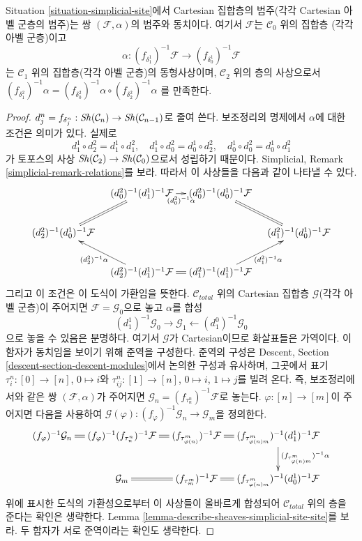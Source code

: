 \begin{lemma}
\label{lemma-characterize-cartesian}
Situation \ref{situation-simplicial-site}에서
Cartesian 집합층의 범주(각각 Cartesian 아벨 군층의 범주)는
쌍 $(\mathcal{F}, \alpha)$의 범주와 동치이다.
여기서 $\mathcal{F}$는 $\mathcal{C}_0$ 위의 집합층
(각각 아벨 군층)이고
$$
\alpha :
(f_{\delta_1^1})^{-1}\mathcal{F}
\longrightarrow (f_{\delta_0^1})^{-1}\mathcal{F}
$$
는 $\mathcal{C}_1$ 위의 집합층(각각 아벨 군층)의 동형사상이며,
$\mathcal{C}_2$ 위의 층의 사상으로서
$(f_{\delta^2_1})^{-1}\alpha =
(f_{\delta^2_0})^{-1}\alpha \circ (f_{\delta^2_2})^{-1}\alpha$
를 만족한다.
\end{lemma}

\begin{proof}
$d^n_j = f_{\delta^n_j} : \mathop{\mathit{Sh}}\nolimits(\mathcal{C}_n) \to
\mathop{\mathit{Sh}}\nolimits(\mathcal{C}_{n - 1})$로 줄여 쓴다.
보조정리의 명제에서 $\alpha$에 대한 조건은 의미가 있다. 실제로
$$
d^1_1 \circ d^2_2 = d^1_1 \circ d^2_1, \quad
d^1_1 \circ d^2_0 = d^1_0 \circ d^2_2, \quad
d^1_0 \circ d^2_0 = d^1_0 \circ d^2_1
$$
가 토포스의 사상
$\mathop{\mathit{Sh}}\nolimits(\mathcal{C}_2) \to \mathop{\mathit{Sh}}\nolimits(\mathcal{C}_0)$으로서 성립하기 때문이다.
Simplicial, Remark \ref{simplicial-remark-relations}를 보라.
따라서 이 사상들을 다음과 같이 나타낼 수 있다.
$$
\xymatrix@C=1em{
& (d^2_0)^{-1}(d^1_1)^{-1}\mathcal{F} \ar[r]_-{(d^2_0)^{-1}\alpha} &
(d^2_0)^{-1}(d^1_0)^{-1}\mathcal{F} \ar@{=}[rd] & \\
(d^2_2)^{-1}(d^1_0)^{-1}\mathcal{F} \ar@{=}[ru] & & &
(d^2_1)^{-1}(d^1_0)^{-1}\mathcal{F} \\
& (d^2_2)^{-1}(d^1_1)^{-1}\mathcal{F} \ar[lu]^{(d^2_2)^{-1}\alpha} \ar@{=}[r] &
(d^2_1)^{-1}(d^1_1)^{-1}\mathcal{F} \ar[ru]_{(d^2_1)^{-1}\alpha}
}
$$
그리고 이 조건은 이 도식이 가환임을 뜻한다.
$\mathcal{C}_{total}$ 위의 Cartesian 집합층
$\mathcal{G}$(각각 아벨 군층)이 주어지면
$\mathcal{F} = \mathcal{G}_0$으로 놓고 $\alpha$를 합성
$$
(d_1^1)^{-1}\mathcal{G}_0 \to \mathcal{G}_1
\leftarrow (d_1^0)^{-1}\mathcal{G}_0
$$
으로 놓을 수 있음은 분명하다. 여기서 $\mathcal{G}$가 Cartesian이므로
화살표들은 가역이다. 이 함자가 동치임을 보이기 위해 준역을 구성한다.
준역의 구성은 Descent, Section
\ref{descent-section-descent-modules}에서 논의한 구성과 유사하며,
그곳에서 표기
$\tau^n_i : [0] \to [n]$, $0 \mapsto i$와
$\tau^n_{ij} : [1] \to [n]$, $0 \mapsto i$, $1 \mapsto j$를 빌려 온다.
즉, 보조정리에서와 같은 쌍 $(\mathcal{F}, \alpha)$가 주어지면
$\mathcal{G}_n = (f_{\tau^n_n})^{-1}\mathcal{F}$로 놓는다.
$\varphi : [n] \to [m]$이 주어지면 다음을 사용하여
$\mathcal{G}(\varphi) : (f_\varphi)^{-1}\mathcal{G}_n \to \mathcal{G}_m$을
정의한다.
$$
\xymatrix@C=1em{
(f_\varphi)^{-1}\mathcal{G}_n \ar@{=}[r] &
(f_\varphi)^{-1}(f_{\tau^n_n})^{-1}\mathcal{F} \ar@{=}[r] &
(f_{\tau^m_{\varphi(n)}})^{-1}\mathcal{F} \ar@{=}[r] &
(f_{\tau^m_{\varphi(n)m}})^{-1}(d^1_1)^{-1}\mathcal{F}
\ar[d]^{(f_{\tau^m_{\varphi(n)m}})^{-1}\alpha} \\
&
\mathcal{G}_m \ar@{=}[r] &
(f_{\tau^m_m})^{-1}\mathcal{F} \ar@{=}[r] &
(f_{\tau^m_{\varphi(n)m}})^{-1}(d^1_0)^{-1}\mathcal{F}
}
$$
위에 표시한 도식의 가환성으로부터 이 사상들이 올바르게 합성되어
$\mathcal{C}_{total}$ 위의 층을 준다는 확인은 생략한다.
Lemma \ref{lemma-describe-sheaves-simplicial-site-site}를 보라.
두 함자가 서로 준역이라는 확인도 생략한다.
\end{proof}

